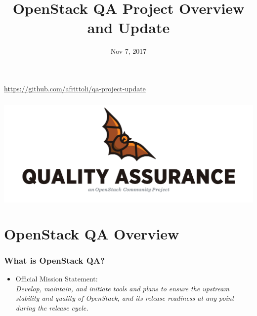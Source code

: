\documentclass[aspectratio=169,11pt,hyperref={colorlinks=true}]{beamer}
\author[Andrea Frittoli]{%
    \texorpdfstring{
        \begin{columns}
            \column{.45\linewidth}
            \centering
            Andrea Frittoli\\
            \href{mailto:andrea.frittoli@gmail.com}{andrea.frittoli@gmail.com}\\
            \texttt{andreaf on Freenode}
        \end{columns}
   }
   {Andrea Frittoli}
}
\date{Nov 7, 2017}
\title[QA Project Update - Sydney, Nov 2017
\hspace{2em}\insertframenumber/\inserttotalframenumber]{OpenStack QA Project Overview and Update}
\begin{document}
{
\begin{frame}[noframenumbering]
    \hypersetup{colorlinks,urlcolor=white}
    \titlepage{}
    \centering
    \href{https://github.com/afrittoli/qa-project-update}{https://github.com/afrittoli/qa-project-update}
\end{frame}
}

\begin{frame}[c]
    \frametitle{}
    \begin{center}
        \includegraphics[width=1.0\textwidth]{OpenStack_Project_QA_vertical.png}
    \end{center}
\end{frame}

\section{OpenStack QA Overview}
\begin{frame}
    \frametitle{What is OpenStack QA?}
    \begin{itemize}
     \item Official Mission Statement:\\
         \textit{Develop, maintain, and initiate tools and plans to ensure
the upstream stability and quality of OpenStack, and its release readiness at
any point during the release cycle.}
    \end{itemize}
\end{frame}
\end{document}
